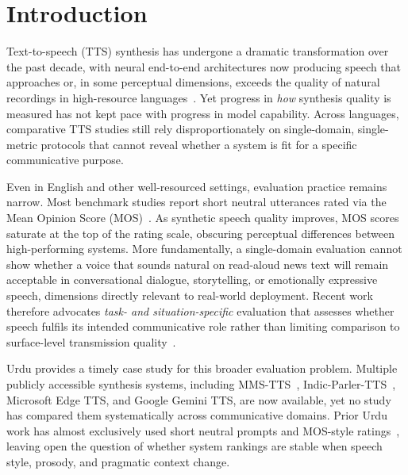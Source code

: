 \documentclass[a4paper,fleqn]{cas-dc}
\begin{document}
    \maketitle
    
    
    \section{Introduction}\label{sec:intro}

    Text-to-speech (TTS) synthesis has undergone a dramatic transformation over the past decade, with neural end-to-end architectures now producing speech that approaches or, in some perceptual dimensions, exceeds the quality of natural recordings in high-resource languages~\citep{lyth2024natural,pratap2023mms}. Yet progress in \emph{how} synthesis quality is measured has not kept pace with progress in model capability. Across languages, comparative TTS studies still rely disproportionately on single-domain, single-metric protocols that cannot reveal whether a system is fit for a specific communicative purpose.
    
    Even in English and other well-resourced settings, evaluation practice remains narrow. Most benchmark studies report short neutral utterances rated via the Mean Opinion Score (MOS)~\citep{kirkland2023mos,lemaguer2024limits}. As synthetic speech quality improves, MOS scores saturate at the top of the rating scale, obscuring perceptual differences between high-performing systems. More fundamentally, a single-domain evaluation cannot show whether a voice that sounds natural on read-aloud news text will remain acceptable in conversational dialogue, storytelling, or emotionally expressive speech, dimensions directly relevant to real-world deployment. Recent work therefore advocates \emph{task- and situation-specific} evaluation that assesses whether speech fulfils its intended communicative role rather than limiting comparison to surface-level transmission quality~\citep{bailly2025hot}.
    
    Urdu provides a timely case study for this broader evaluation problem. Multiple publicly accessible synthesis systems, including MMS-TTS~\citep{pratap2023mms}, Indic-Parler-TTS~\citep{lyth2024natural,lacombe2024parlertts}, Microsoft Edge TTS, and Google Gemini TTS, are now available, yet no study has compared them systematically across communicative domains. Prior Urdu work has almost exclusively used short neutral prompts and MOS-style ratings~\citep{naseem2024developing,jamal2022transfer}, leaving open the question of whether system rankings are stable when speech style, prosody, and pragmatic context change.
    
\end{document}
